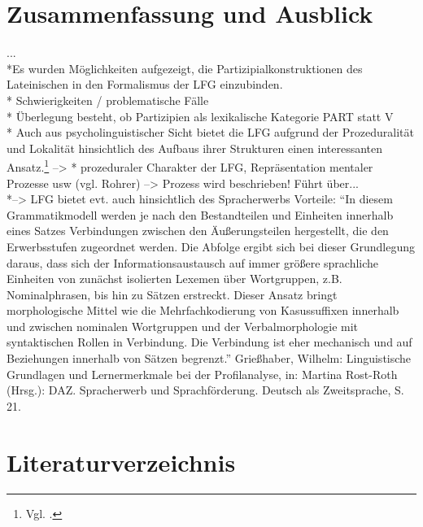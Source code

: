 \documentclass[12pt,a4paper]{article}
\begin{document}
\section{Zusammenfassung und Ausblick}
... \\
*Es wurden Möglichkeiten aufgezeigt, die Partizipialkonstruktionen des Lateinischen in den Formalismus der LFG einzubinden. \\
* Schwierigkeiten / problematische Fälle \\
* Überlegung besteht, ob Partizipien als lexikalische Kategorie PART statt V \\
* Auch aus psycholinguistischer Sicht bietet die LFG aufgrund der Prozeduralität und Lokalität hinsichtlich des Aufbaus ihrer Strukturen einen interessanten Ansatz.\footnote{Vgl. \cite[?]{Rohrer}.} --> * prozeduraler Charakter der LFG, Repräsentation mentaler Prozesse usw (vgl. Rohrer) --> Prozess wird beschrieben! Führt über... \\
*--> LFG bietet evt. auch hinsichtlich des Spracherwerbs Vorteile: ``In diesem Grammatikmodell werden je nach den Bestandteilen und Einheiten innerhalb eines Satzes Verbindungen zwischen den Äußerungsteilen hergestellt, die den Erwerbsstufen zugeordnet werden. Die Abfolge ergibt sich bei dieser Grundlegung daraus, dass sich der Informationsaustausch auf immer größere sprachliche Einheiten von zunächst isolierten Lexemen über Wortgruppen, z.B. Nominalphrasen, bis hin zu Sätzen erstreckt. Dieser Ansatz bringt morphologische Mittel wie die Mehrfachkodierung von Kasussuffixen innerhalb und zwischen nominalen Wortgruppen und der Verbalmorphologie mit syntaktischen Rollen in Verbindung. Die Verbindung ist eher mechanisch und auf Beziehungen innerhalb von Sätzen begrenzt.''
Grießhaber, Wilhelm: Linguistische Grundlagen und Lernermerkmale bei der Profilanalyse, in: Martina Rost-Roth (Hrsg.): DAZ. Spracherwerb und Sprachförderung. Deutsch als Zweitsprache, S. 21. 
%
\pagebreak
\section*{Literaturverzeichnis}
\printbibliography
\end{document}
